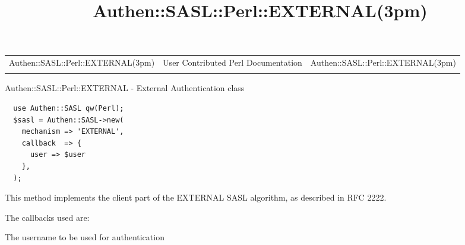 \documentclass[]{article}
\title{Authen::SASL::Perl::EXTERNAL(3pm)}
\author{}
\date{}
\begin{document}
\maketitle

\begin{longtable}[c]{@{}lll@{}}
\toprule\addlinespace
Authen::SASL::Perl::EXTERNAL(3pm) & User Contributed Perl Documentation
& Authen::SASL::Perl::EXTERNAL(3pm)
\\\addlinespace
\bottomrule
\end{longtable}


Authen::SASL::Perl::EXTERNAL - External Authentication class


\begin{verbatim}
  use Authen::SASL qw(Perl);
  $sasl = Authen::SASL->new(
    mechanism => 'EXTERNAL',
    callback  => {
      user => $user
    },
  );
\end{verbatim}


This method implements the client part of the EXTERNAL SASL algorithm,
as described in RFC 2222.


The callbacks used are:

\begin{description}
\itemsep1pt\parskip0pt
\item[user]
The username to be used for authentication
\end{description}

\end{document}
